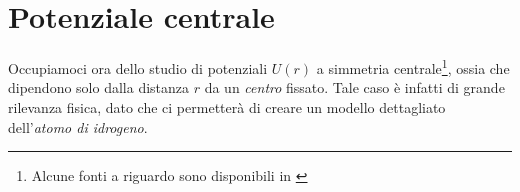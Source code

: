 \documentclass[../../FisicaTeorica.tex]{subfiles}
\begin{document}

\section{Potenziale centrale}
Occupiamoci ora dello studio di potenziali $U(r)$ a simmetria centrale\footnote{Alcune fonti a riguardo sono disponibili in \cite{fonti_pot-centrale}}, ossia che dipendono solo dalla distanza $r$ da un \textit{centro} fissato. Tale caso è infatti di grande rilevanza fisica, dato che ci permetterà di creare un modello dettagliato dell'\textit{atomo di idrogeno}.\\
\end{document}
